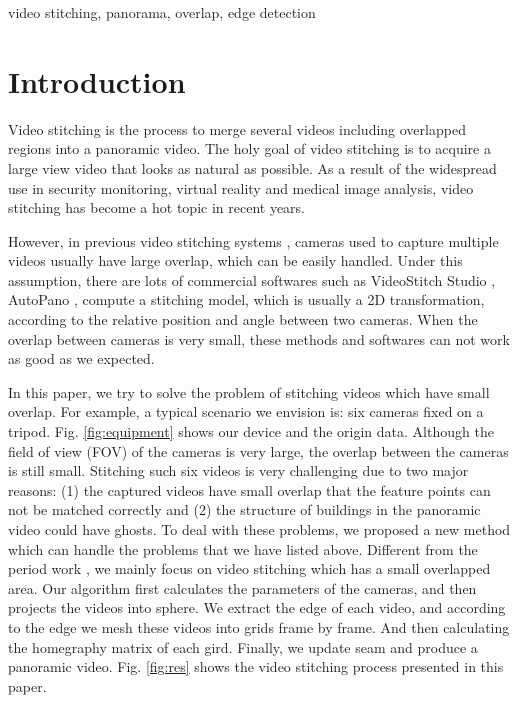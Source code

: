 \documentclass[conference]{IEEEtran}
\begin{document}
\begin{IEEEkeywords}
video stitching, panorama, overlap, edge detection
\end{IEEEkeywords}

\section{Introduction}
\label{sec:intro}

Video stitching is the process to merge several videos
including overlapped regions into a panoramic video. The
holy goal of video stitching is to acquire a large view video
that looks as natural as possible. As a result of the widespread
use in security monitoring, virtual reality and medical image
analysis, video stitching has become a hot topic in recent years.

However, in previous video stitching systems \cite{zheng2008stitching, guo2016joint, Jiang_2015_CVPR_Workshops, nie2018dynamic},
cameras used to capture multiple videos usually have large overlap, which can be easily handled.
Under this assumption, there are lots of commercial softwares such as VideoStitch Studio \cite{videostitching}, AutoPano \cite{autopano},
compute a stitching model, which is usually a 2D transformation,
according to the relative position and angle between two cameras. 
When the overlap between cameras is very small, these methods and softwares can
not work as good as we expected.

In this paper, we try to solve the problem of stitching videos which have small overlap. 
For example, a typical scenario we envision is: six cameras fixed on 
a tripod. Fig. \ref{fig:equipment} shows our device and the origin data. Although the field of view (FOV) of the cameras is very large, the overlap between the 
cameras is still small. Stitching such six videos is very challenging due to two
major reasons: (1) the captured videos have small overlap that the feature points can not be matched correctly 
and (2) the structure of buildings in the panoramic video could have ghosts.
To deal with these problems, we proposed a new method which can handle the problems that we have listed above.
Different from the period work \cite{Jiang_2015_CVPR_Workshops}, we mainly focus on video stitching which has a small overlapped area.
Our algorithm first calculates the parameters of the cameras, and then projects
the videos into sphere. We extract the edge of each video, and according to the edge we mesh these videos into grids frame by frame.
And then calculating the homegraphy matrix of each gird. Finally, we update seam and produce a panoramic video.
Fig. \ref{fig:res} shows the video stitching process presented in this paper.
\end{document}
